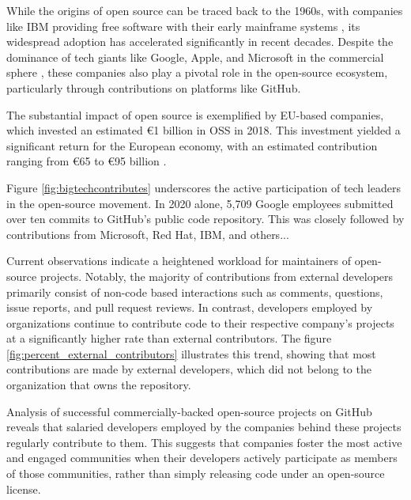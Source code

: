 While the origins of open source can be traced back to the 1960s, with companies like IBM providing free software with their early mainframe systems \cite{moreno2006open}, its widespread adoption has accelerated significantly in recent decades.  Despite the dominance of tech giants like Google, Apple, and Microsoft in the commercial sphere \cite{jacobides2020regulating}, these companies also play a pivotal role in the open-source ecosystem, particularly through contributions on platforms like GitHub.

The substantial impact of open source is exemplified by EU-based companies, which invested an estimated €1 billion in OSS in 2018. This investment yielded a significant return for the European economy, with an estimated contribution ranging from €65 to €95 billion \cite{blind2021impact}.

Figure \ref{fig:bigtechcontributes} underscores the active participation of tech leaders in the open-source movement.  In 2020 alone, 5,709 Google employees submitted over ten commits to GitHub's public code repository. This was closely followed by contributions from Microsoft, Red Hat, IBM, and others...

Current observations indicate a heightened workload for maintainers of open-source projects. Notably, the majority of contributions from external developers primarily consist of non-code based interactions such as comments, questions, issue reports, and pull request reviews. In contrast, developers employed by organizations continue to contribute code to their respective company's projects at a significantly higher rate than external contributors. The figure \ref{fig:percent_external_contributors} illustrates this trend, showing that most contributions are made by external developers, which did not belong to the organization that owns the repository.

Analysis of successful commercially-backed open-source projects on GitHub reveals that salaried developers employed by the companies behind these projects regularly contribute to them. This suggests that companies foster the most active and engaged communities when their developers actively participate as members of those communities, rather than simply releasing code under an open-source license.

